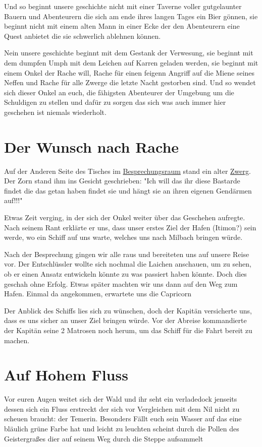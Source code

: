\documentclass[10pt,twoside,twocolumn,openany]{book}
\begin{document}
	Und so beginnt unsere geschichte nicht mit einer Taverne voller gutgelaunter Bauern und Abenteurern die sich am ende ihres langen Tages ein Bier gönnen, sie beginnt nicht mit einem alten Mann in einer Ecke der den Abenteurern eine Quest anbietet die sie schwerlich ablehnen können.
	
	Nein unsere geschichte beginnt mit dem Gestank der Verwesung, sie beginnt mit dem dumpfen Umph mit dem Leichen auf Karren geladen werden, sie beginnt mit einem Onkel der Rache will, Rache für einen feigenn Angriff auf die Miene seines Neffen und Rache für alle Zwerge die letzte Nacht gestorben sind. Und so wendet sich dieser Onkel an euch, die fähigsten Abenteurer der Umgebung um die Schuldigen zu stellen und dafür zu sorgen das sich was auch immer hier geschehen ist niemals wiederholt.
	
	\section{Der Wunsch nach Rache}
	Auf der Anderen Seite des Tisches im \hyperref[Besprechungsraum]{Besprechungsraum} stand ein alter \hyperref[Onkel]{Zwerg}. Der Zorn stand ihm ins Gesicht geschrieben: \newline
	"Ich will das ihr diese Bastarde findet die das getan haben findet sie und hängt sie an ihren eigenen Gendärmen auf!!!" 
	
	Etwas Zeit verging, in der sich der Onkel weiter über das Geschehen aufregte. Nach seinem Rant erklärte er uns, dass unser erstes Ziel der Hafen (Itimon?) sein werde, wo ein Schiff auf uns warte, welches uns nach Milbach bringen würde. 
	
	Nach der Besprechung gingen wir alle raus und bereiteten uns auf unsere Reise vor. Der Entschlüssler wollte sich nochmal die Laichen anschauen, um zu sehen, ob er einen Ansatz entwickeln könnte zu was passiert haben könnte. Doch dies geschah ohne Erfolg. \newline
	Etwas später machten wir uns dann auf den Weg zum Hafen. Einmal da angekommen, erwartete uns die Capricorn
	
	Der Anblick des Schiffs lies sich zu wünschen, doch der Kapitän versicherte uns, dass es uns sicher an unser Ziel bringen würde. Vor der Abreise kommandierte der Kapitän seine 2 Matrosen noch herum, um das Schiff für die Fahrt bereit zu machen. 
	
	\section{Auf Hohem Fluss}
	Vor euren Augen weitet sich der Wald und ihr seht ein verladedock jenseits dessen sich ein Fluss erstreckt der sich vor Vergleichen mit dem Nil nicht zu scheuen braucht: der Temerin.
	Besonders Fällt euch sein Wasser auf das eine bläulich grüne Farbe hat und leicht zu leuchten scheint durch die Pollen des Geistergraßes dier auf seinem Weg durch die Steppe aufsammelt
\end{document}
